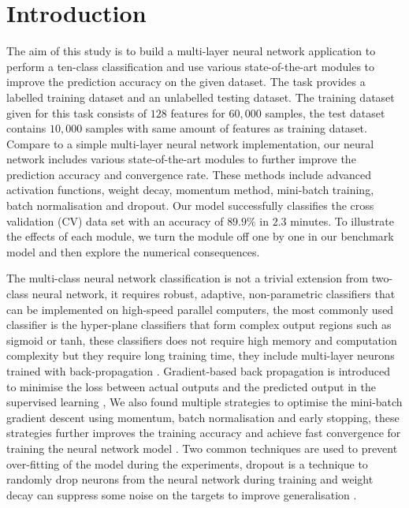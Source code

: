 \section{Introduction\label{chapter1}}

The aim of this study is to build a multi-layer neural network application to perform a ten-class classification and use various state-of-the-art modules to improve the prediction accuracy on the given dataset.
The task provides a labelled training dataset and an unlabelled testing dataset.
The training dataset given for this task consists of $128$ features for $60,000$ samples,
the test dataset contains $10,000$ samples with same amount of features as training dataset.
Compare to a simple multi-layer neural network implementation,%
our neural network includes various state-of-the-art modules to further improve the prediction accuracy and convergence rate. These methods include advanced activation functions, 
weight decay, 
momentum method,
mini-batch training, batch normalisation and dropout. 
Our model successfully classifies the cross validation (CV) data set with an accuracy of $89.9\%$ in $2.3$ minutes. 
To illustrate the effects of each module, we turn the module off one by one in our benchmark model and then explore the numerical consequences.

The multi-class neural network classification is not a trivial extension from two-class neural network,
it requires robust, adaptive, non-parametric classifiers that can be implemented on high-speed parallel computers,
the most commonly used classifier is the hyper-plane classifiers that form complex output regions such as sigmoid or tanh,
these classifiers does not require high memory and computation complexity but they require long training time,
they include multi-layer neurons trained with back-propagation \citep{werbos1990backpropagation}.
Gradient-based back propagation is introduced to minimise the loss between actual outputs and the predicted output in the supervised learning \citep{lecun1998Gradient},
We also found multiple strategies to optimise the mini-batch gradient descent using momentum, batch normalisation and early stopping,
these strategies further improves the training accuracy and achieve fast convergence for training the neural network model \citep{ruder2016overview}.
Two common techniques are used to prevent over-fitting of the model during the experiments, dropout is a technique to randomly drop neurons from the neural network during training \citet{dropout} and weight decay can suppress some noise on the targets to improve generalisation \citep{NIPS1991_563}.

